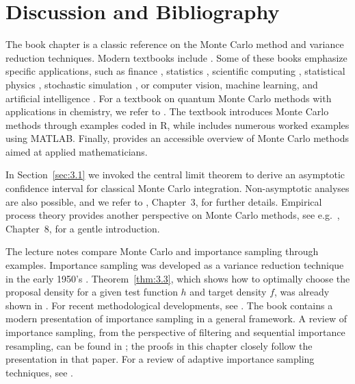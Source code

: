 
\section{Discussion and Bibliography}
\label{sec:3.4}

The book chapter \cite{105} is a classic reference on the Monte Carlo method and variance
reduction techniques. Modern textbooks include \cite{14, 179, 90, 130, 145, 193, 95, 15,
173, 194}. Some of these books emphasize specific applications, such as finance
\cite{90, 234, 116}, statistics \cite{14, 193, 179}, scientific computing \cite{145},
statistical physics \cite{173}, stochastic simulation \cite{95}, or computer vision,
machine learning, and artificial intelligence \cite{15}. For a textbook on quantum Monte
Carlo methods with applications in chemistry, we refer to \cite{99}. The textbook
\cite{194} introduces Monte Carlo methods through examples coded in R, while \cite{130}
includes numerous worked examples using MATLAB\@. Finally, \cite{40} provides an accessible
overview of Monte Carlo methods aimed at applied mathematicians.

In Section~\ref{sec:3.1} we invoked the central limit theorem to derive an asymptotic
confidence interval for classical Monte Carlo integration. Non-asymptotic analyses are also
possible, and we refer to \cite{95}, Chapter~3, for further details. Empirical process theory
provides another perspective on Monte Carlo methods, see e.g.\ \cite{231}, Chapter~8, for a
gentle introduction.

The lecture notes \cite{9} compare Monte Carlo and importance sampling through examples.
Importance sampling was developed as a variance reduction technique in the early 1950's
\cite{121, 120}. Theorem~\ref{thm:3.3}, which shows how to optimally choose the proposal
density for a given test function $h$ and target density $f$, was already shown in
\cite{121}. For recent methodological developments, see \cite{140, 178, 146, 222, 122}. The
book \cite{49} contains a modern presentation of importance sampling in a general framework.
A review of importance sampling, from the perspective of filtering and sequential importance
resampling, can be found in \cite{3}; the proofs in this chapter closely follow the
presentation in that paper. For a review of adaptive importance sampling techniques, see
\cite{39}.

